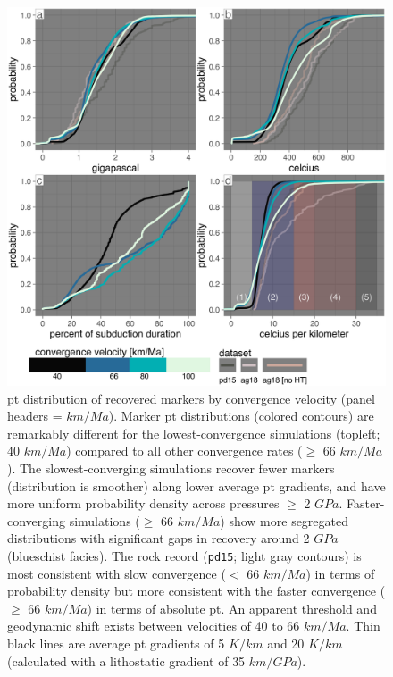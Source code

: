 \begin{figure}[htbp]

{\centering \includegraphics[width=1\linewidth,]{assets/figs/chpt4/cv_cdf} 

}

\caption[\gls{pt} distribution of recovered markers by convergence velocity]{\gls{pt} distribution of recovered markers by convergence velocity (panel headers = \(km/Ma\)). Marker \gls{pt} distributions (colored contours) are remarkably different for the lowest-convergence simulations (topleft; 40 \(km/Ma\)) compared to all other convergence rates (\(\geq\) 66 \(km/Ma\)). The slowest-converging simulations recover fewer markers (distribution is smoother) along lower average \gls{pt} gradients, and have more uniform probability density across pressures \(\geq\) 2 \(GPa\). Faster-converging simulations (\(\geq\) 66 \(km/Ma\)) show more segregated distributions with significant gaps in recovery around 2 \(GPa\) (blueschist facies). The rock record (\texttt{pd15}; light gray contours) is most consistent with slow convergence (\(<\) 66 \(km/Ma\)) in terms of probability density but more consistent with the faster convergence (\(\geq\) 66 \(km/Ma\)) in terms of absolute \gls{pt}. An apparent threshold and geodynamic shift exists between velocities of 40 to 66 \(km/Ma\). Thin black lines are average \gls{pt} gradients of 5 \(K/km\) and 20 \(K/km\) (calculated with a lithostatic gradient of 35 \(km/GPa\)).}\label{fig:cvDensity}
\end{figure}

